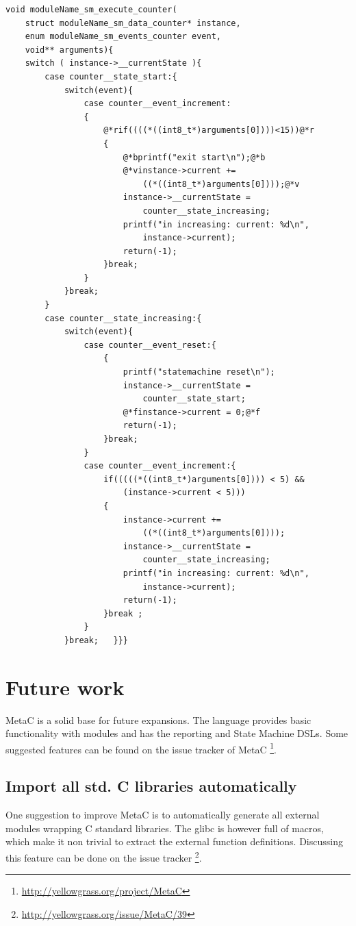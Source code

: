 \documentclass[a4paper,10pt,titlepage]{report}
\begin{document}
\begin{lstlisting}
void moduleName_sm_execute_counter(
    struct moduleName_sm_data_counter* instance, 
    enum moduleName_sm_events_counter event, 
    void** arguments){
    switch ( instance->__currentState ){
        case counter__state_start:{
            switch(event){
                case counter__event_increment:
                {
                    @*rif((((*((int8_t*)arguments[0])))<15))@*r
                    {
                        @*bprintf("exit start\n");@*b
                        @*vinstance->current += 
                            ((*((int8_t*)arguments[0])));@*v
                        instance->__currentState = 
                            counter__state_increasing;
                        printf("in increasing: current: %d\n", 
                            instance->current);
                        return(-1);
                    }break;
                }
            }break;
        }
        case counter__state_increasing:{    
            switch(event){
                case counter__event_reset:{
                    {
                        printf("statemachine reset\n");
                        instance->__currentState = 
                            counter__state_start;
                        @*finstance->current = 0;@*f
                        return(-1);
                    }break;
                }
                case counter__event_increment:{
                    if(((((*((int8_t*)arguments[0]))) < 5) && 
                        (instance->current < 5)))
                    {
                        instance->current +=
                            ((*((int8_t*)arguments[0])));
                        instance->__currentState = 
                            counter__state_increasing;
                        printf("in increasing: current: %d\n",
                            instance->current);
                        return(-1);
                    }break ;
                }
            }break;   }}}
\end{lstlisting}

\chapter{Future work}
MetaC is a solid base for future expansions. The language provides basic functionality with modules and has the reporting and State Machine DSLs. Some suggested features can be found on the issue tracker of MetaC \footnote{\url{http://yellowgrass.org/project/MetaC}}.

\section{Import all std. C libraries automatically}
One suggestion to improve MetaC is to automatically generate all external modules wrapping C standard libraries. The glibc is however full of macros, which make it non trivial to extract the external function definitions. Discussing this feature can be done on the issue tracker \footnote{\url{http://yellowgrass.org/issue/MetaC/39}}.
\end{document}
